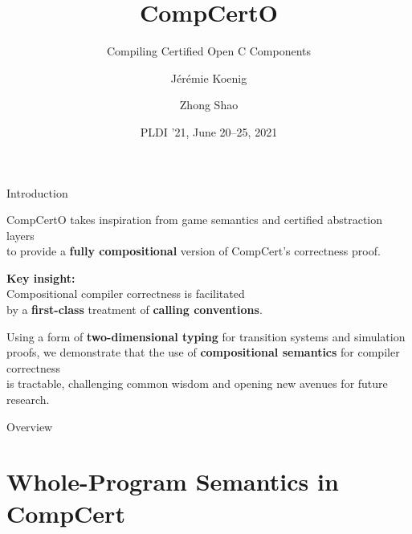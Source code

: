 \documentclass[aspectratio=169,mathserif]{beamer}
\title{CompCertO}
\subtitle{Compiling Certified Open C Components}
\author{Jérémie Koenig \and Zhong Shao}
\institute{Yale University}
\date{PLDI '21, June 20--25, 2021}
\begin{document}
\maketitle

\begin{frame}{Introduction} %

  CompCertO takes inspiration from game semantics
  and certified abstraction layers \\
  to provide a \textbf{fully compositional} version
  of CompCert's correctness proof.

  \pause\vfill
  \begin{center}
    \textbf{Key insight:} \\
    \Large
    Compositional compiler correctness is facilitated \\ by
    a \textbf{first-class} treatment of \textbf{calling conventions}.
  \end{center}

  \vfill
  Using a form of \textbf{two-dimensional typing} 
  for transition systems and simulation proofs,
  we demonstrate that
  the use of \textbf{compositional semantics} for compiler correctness \\
  is tractable,
  challenging common wisdom and opening new avenues for future research.
\end{frame}

\begin{frame}{Overview}

  \tableofcontents
\end{frame}

\section{Whole-Program Semantics in CompCert}
\end{document}
